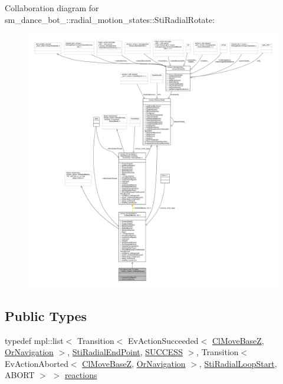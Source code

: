 Collaboration diagram for sm\+\_\+dance\+\_\+bot\+\_\+:\+:radial\+\_\+motion\+\_\+states\+:\+:Sti\+Radial\+Rotate\+:
\nopagebreak
\begin{figure}[H]
\begin{center}
\leavevmode
\includegraphics[width=350pt]{structsm__dance__bot__3_1_1radial__motion__states_1_1StiRadialRotate__coll__graph}
\end{center}
\end{figure}
\subsection*{Public Types}
\begin{DoxyCompactItemize}
\item 
typedef mpl\+::list$<$ Transition$<$ Ev\+Action\+Succeeded$<$ \hyperlink{classmove__base__z__client_1_1ClMoveBaseZ}{Cl\+Move\+BaseZ}, \hyperlink{classsm__dance__bot__3_1_1OrNavigation}{Or\+Navigation} $>$, \hyperlink{structsm__dance__bot__3_1_1radial__motion__states_1_1StiRadialEndPoint}{Sti\+Radial\+End\+Point}, \hyperlink{classSUCCESS}{S\+U\+C\+C\+E\+SS} $>$, Transition$<$ Ev\+Action\+Aborted$<$ \hyperlink{classmove__base__z__client_1_1ClMoveBaseZ}{Cl\+Move\+BaseZ}, \hyperlink{classsm__dance__bot__3_1_1OrNavigation}{Or\+Navigation} $>$, \hyperlink{structsm__dance__bot__3_1_1radial__motion__states_1_1StiRadialLoopStart}{Sti\+Radial\+Loop\+Start}, A\+B\+O\+RT $>$ $>$ \hyperlink{structsm__dance__bot__3_1_1radial__motion__states_1_1StiRadialRotate_a557d96f2bd2ac0f6cac096bf6da2cd30}{reactions}
\end{DoxyCompactItemize}
